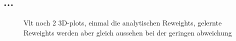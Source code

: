 \subsection{...}

\begin{figure}[tbp]
	\centering
	\caption{Vlt noch 2 3D-plots, einmal die analytischen Reweights, gelernte Reweights werden aber gleich aussehen bei der geringen abweichung}
	\label{32,33}
\end{figure}
